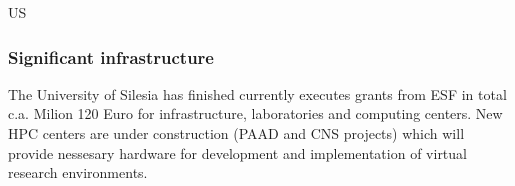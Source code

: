 \begin{sitedescription}{US}
\subsubsection*{Significant infrastructure}

The University of Silesia has finished currently executes grants from
ESF in total c.a. Milion 120 Euro for infrastructure, laboratories and
computing centers. New HPC centers are under construction (PAAD and
CNS projects) which will provide nessesary hardware for development
and implementation of virtual research environments.



\end{sitedescription}
